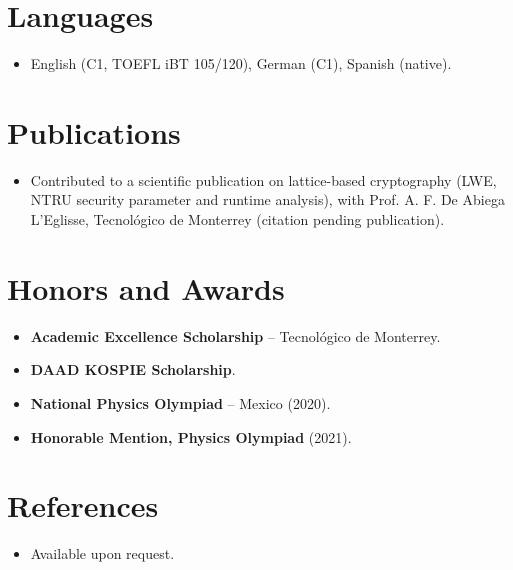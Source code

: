 \documentclass[11pt,a4paper,sans]{moderncv}
\begin{document}

\section{Languages}
\vspace{1pt}
\begin{itemize}
\item English (C1, TOEFL iBT 105/120), German (C1), Spanish (native).
\end{itemize}


\section{Publications}
\vspace{1pt}
\begin{itemize}
\item Contributed to a scientific publication on lattice-based cryptography (LWE, NTRU security parameter and runtime analysis), with Prof. A. F. De Abiega L'Eglisse, Tecnológico de Monterrey (citation pending publication).
\end{itemize}


\section{Honors and Awards}
\vspace{1pt}
\begin{itemize}
\item{\textbf{Academic Excellence Scholarship} -- Tecnológico de Monterrey.}
\item{\textbf{DAAD KOSPIE Scholarship}.}
\item{\textbf{National Physics Olympiad} -- Mexico (2020).}
\item{\textbf{Honorable Mention, Physics Olympiad} (2021).}
\end{itemize}


\section{References}
\vspace{1pt}
\begin{itemize}
\item{Available upon request.}
\end{itemize}
\end{document}
